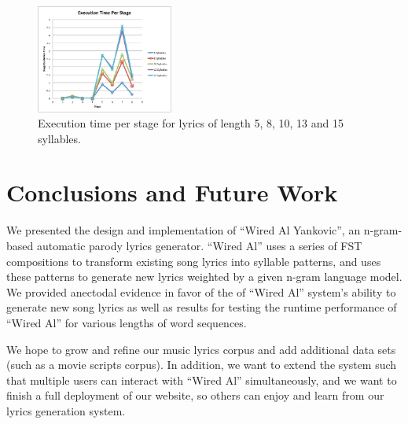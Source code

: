 \documentclass{vgtc}                          %
\begin{document}
\begin{figure}[t]
\centering
\includegraphics[width=0.4\textwidth]{images/pdf/runtime_per_stage.pdf}
\caption{Execution time per stage for lyrics of length 5, 8, 10, 13 and 15 syllables.}
\label{fig:perf2}
\end{figure}

\section{Conclusions and Future Work}

We presented the design and implementation of ``Wired Al Yankovic'',
an n-gram-based automatic parody lyrics generator. ``Wired Al''
uses a series of FST compositions to transform existing
song lyrics into syllable patterns, and uses these patterns
to generate new lyrics weighted by a given n-gram language model.
We provided anectodal evidence in favor of the of ``Wired Al''
system's ability to generate new song lyrics as well as results
for testing the runtime performance of ``Wired Al'' for
various lengths of word sequences.

We hope to grow and refine our music lyrics corpus and add additional
data sets (such as a movie scripts corpus). In addition, we want
to extend the system such that multiple users can interact with
``Wired Al'' simultaneously, and we want to finish a full deployment
of our website, so others can enjoy and learn from our lyrics generation
system.

%


\end{document}
